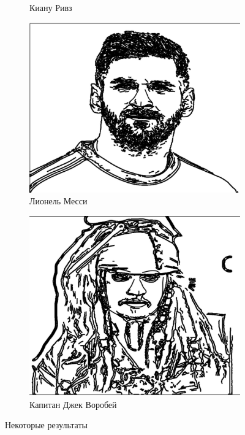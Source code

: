 \documentclass[a4paper, 11pt]{article}
\begin{document}
\begin{figure}[h!]
\begin{subfigure}{0.49\linewidth}
		\caption{Киану Ривз} \label{rivz}
	\end{subfigure}
	\begin{subfigure}{0.49\linewidth}
	\includegraphics[width=\linewidth]{"Messi.jpeg"}
	\caption{Лионель Месси} \label{messi}
	\end{subfigure}
	\begin{subfigure}{0.49\linewidth}
		\includegraphics[width=\linewidth]{"Jack-the-sparrow.jpeg"}
		\caption{Капитан Джек Воробей} \label{jack-the-sparrow}
	\end{subfigure}

	\caption{Некоторые результаты}\label{examples}
\end{figure}
\end{document}
